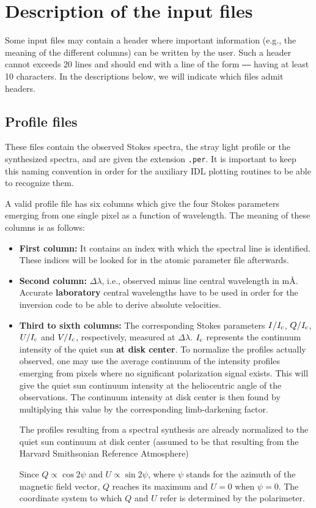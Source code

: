 \documentclass[11pt]{report}
\begin{document}
\section{Description of the input files}
Some input files may contain a header where important information
(e.g., the meaning of the different columns) can be written by the
user. Such a header cannot exceeds 20 lines and should end with a line
of the form {\tt -----} having at least 10 characters. In the
descriptions below, we will indicate which files admit headers.

\subsection{Profile files}
\label{profiles}
These files contain the observed Stokes spectra, the stray light profile or
the synthesized spectra, and are given the extension {\tt .per}. It
is important to keep this naming convention in order for the auxiliary IDL 
plotting routines to be able to recognize them. 

A valid profile file has six columns which give the four Stokes parameters 
emerging from one single pixel as a function of wavelength. The meaning of 
these columns is as follows:
\begin{itemize}
\item {\bf First column:} It contains an index with which the spectral line is 
identified. These indices will be looked for in the atomic parameter file afterwards. 

\item {\bf Second column:} $\Delta \lambda$, i.e., observed minus line central 
wavelength in m\AA\/. Accurate {\bf laboratory} central wavelengths have to be used
in order for the inversion code to be able to derive absolute velocities.

\item {\bf Third to sixth columns:} The corresponding Stokes parameters
$I/I_{\rm c}$, $Q/I_{\rm c}$, $U/I_{\rm c}$ and $V/I_{\rm c}$,
respectively, measured at $\Delta \lambda$.  $I_{\rm c}$ represents the
continuum intensity of the quiet sun  {\bf at disk center}. To
normalize the profiles actually observed, one may use the average
continuum of the intensity profiles emerging from pixels where no
significant polarization signal exists. This will give the quiet
sun continuum intensity at the heliocentric angle of the observations. 
The continuum intensity at disk center is then found by multiplying this
value by the corresponding limb-darkening factor. 

The profiles resulting from a spectral synthesis are already normalized 
to the quiet sun continuum at disk center (assumed to be that resulting from 
the Harvard Smithsonian Reference Atmosphere)

Since $Q \propto \cos 2\psi$ and $U \propto \sin 2\psi$, where $\psi$ 
stands for the azimuth of the magnetic field vector, $Q$ reaches its 
maximum and $U =0$ when $\psi =0$. The coordinate system to which
$Q$ and $U$ refer is determined by the polarimeter. 


\end{itemize}
\end{document}

